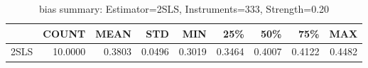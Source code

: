 \begin{table}[ht]
\centering
\caption{bias summary: Estimator=2SLS, Instruments=333, Strength=0.20}
\begin{tabular}{lrrrrrrrr}
\toprule
 & COUNT & MEAN & STD & MIN & 25\% & 50\% & 75\% & MAX \\
\midrule
2SLS & 10.0000 & 0.3803 & 0.0496 & 0.3019 & 0.3464 & 0.4007 & 0.4122 & 0.4482 \\
\bottomrule
\end{tabular}
\end{table}
